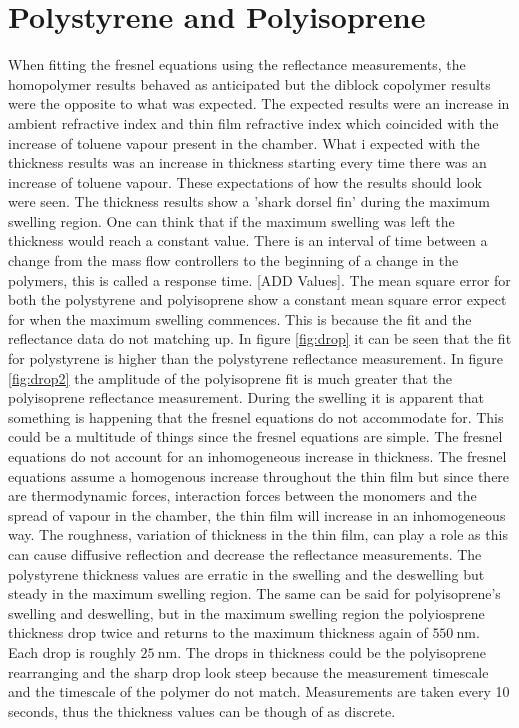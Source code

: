 \documentclass[MasterThesisMain.tex]{subfiles}
\begin{document}
\section{Polystyrene and Polyisoprene}
When fitting the fresnel equations using the reflectance measurements, the homopolymer results behaved as anticipated but the diblock copolymer results were the opposite to what was expected. The expected results were an increase in ambient refractive index and thin film refractive index which coincided with the increase of toluene vapour present in the chamber. What i expected with the thickness results was an increase in thickness starting every time there was an increase of toluene vapour. These expectations of how the results should look were seen. The thickness results show a 'shark dorsel fin' during the maximum swelling region. One can think that if the maximum swelling was left the thickness would reach a constant value. There is an interval of time between a change from the mass flow controllers to the beginning of a change in the polymers, this is called a response time. [ADD Values]. The mean square error for both the polystyrene and polyisoprene show a constant mean square error expect for when the maximum swelling commences. This is because the fit and the reflectance data do not matching up. In figure \ref{fig:drop} it can be seen that the fit for polystyrene is higher than the polystyrene reflectance measurement. In figure \ref{fig:drop2} the amplitude of the polyisoprene fit is much greater that the polyisoprene reflectance measurement. During the swelling it is apparent that something is happening that the fresnel equations do not accommodate for. This could be a multitude of things since the fresnel equations are simple. The fresnel equations do not account for an inhomogeneous increase in thickness. The fresnel equations assume a homogenous increase throughout the thin film but since there are thermodynamic forces, interaction forces between the monomers and the spread of vapour in the chamber, the thin film will increase in an inhomogeneous way. The roughness, variation of thickness in the thin film, can play a role as this can cause diffusive reflection and decrease the reflectance measurements. The polystyrene thickness values are erratic in the swelling and the deswelling but steady in the maximum swelling region. The same can be said for polyisoprene's swelling and deswelling, but in the maximum swelling region the polyiosprene thickness drop twice and returns to the maximum thickness again of $\SI{550}{\nano\meter}$. Each drop is roughly $\SI{25}{\nano\meter}$. The drops in thickness could be the polyisoprene rearranging and the sharp drop look steep because the measurement timescale and the timescale of the polymer do not match. Measurements are taken every 10 seconds, thus the thickness values can be though of as discrete.
\end{document}
